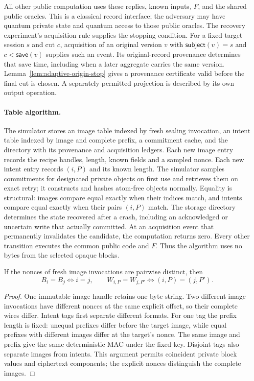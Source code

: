 All other public computation uses these replies, known inputs, $F$, and the
shared public oracles. This is a classical record interface; the adversary
may have quantum private state and quantum access to those public oracles.
The recovery experiment's acquisition rule supplies the stopping condition.
For a fixed target session $s$ and cut $c$, acquisition
of an original version $v$ with $\mathsf{subject}(v)=s$ and
$c<\mathsf{save}(v)$ supplies such an event. Its original-record provenance
determines that save time, including when a later aggregate carries the same
version. Lemma~\ref{lem:adaptive-origin-stop} gives a provenance certificate
valid before the final cut is chosen. A separately permitted projection is
described by its own output operation.

\paragraph{Table algorithm.}
The simulator stores an image table indexed by fresh sealing invocation,
an intent table indexed by image and complete prefix, a commitment cache,
and the directory with its provenance and acquisition ledgers. Each new
image entry records the recipe handles, length, known fields and a sampled
nonce. Each new intent entry records $(i,P)$ and its known length. The
simulator samples commitments for designated private objects on first use
and retrieves them on exact retry; it constructs and hashes atom-free
objects normally.
Equality is structural: images compare equal exactly when their indices
match, and intents compare equal exactly when their pairs $(i,P)$ match.
The storage directory determines the state recovered after a crash, including
an acknowledged or uncertain write that actually committed. At an acquisition
event that permanently invalidates the candidate, the computation returns
zero. Every other transition executes the common public code and $F$.
Thus the algorithm uses
no bytes from the selected opaque blocks.

\begin{lemma}
\label{lem:record-structural-equality}
If the nonces of fresh image invocations are pairwise distinct, then
\[
 B_i=B_j\iff i=j,\qquad
 W_{i,P}=W_{j,P'}\iff(i,P)=(j,P').
\]
\end{lemma}
\begin{proof}
One immutable image handle retains one byte string. Two different image
invocations have different nonces at the same explicit offset, so their
complete wires differ. Intent tags first separate different formats. For
one tag the prefix length is fixed: unequal prefixes differ before the
target image, while equal prefixes with different images differ at the
target's nonce. The same image and prefix give the same deterministic MAC
under the fixed key. Disjoint tags also separate images from intents.
This argument permits coincident private block values and ciphertext
components; the explicit nonces distinguish the complete images.
\end{proof}

